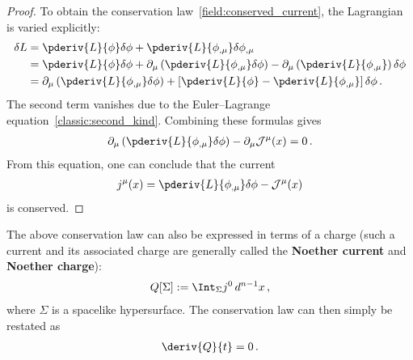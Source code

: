 \begin{theorem}
\begin{mdframed}[roundcorner=10pt, linecolor=blue, linewidth=1pt]
\begin{proof}
                To obtain the conservation law~\eqref{field:conserved_current}, the Lagrangian is varied explicitly:
                \begin{align*}
                    \delta L &= \pderiv{L}{\phi}\delta\phi + \pderiv{L}{\phi_{,\mu}}\delta\phi_{,\mu}\\
                    &= \pderiv{L}{\phi}\delta\phi + \partial_\mu\left(\pderiv{L}{\phi_{,\mu}}\delta\phi\right) - \partial_\mu\left(\pderiv{L}{\phi_{,\mu}}\right)\delta\phi\\
                    &= \partial_\mu\left(\pderiv{L}{\phi_{,\mu}}\delta\phi\right) + \left[\pderiv{L}{\phi} - \pderiv{L}{\phi_{,\mu}}\right]\delta\phi\,.
                \end{align*}
                The second term vanishes due to the Euler--Lagrange equation~\eqref{classic:second_kind}. Combining these formulas gives
                \begin{gather}
                    \partial_\mu\left(\pderiv{L}{\phi_{,\mu}}\delta\phi\right) - \partial_\mu\mathcal{J}^\mu(x) = 0\,.
                \end{gather}
                From this equation, one can conclude that the current
                \begin{gather}
                    j^\mu(x) = \pderiv{L}{\phi_{,\mu}}\delta\phi - \mathcal{J}^\mu(x)
                \end{gather}
                is conserved.
            \end{proof}
        \end{mdframed}
    \end{theorem}
    The above conservation law can also be expressed in terms of a charge (such a current and its associated charge are generally called the \textbf{Noether current} and \textbf{Noether charge}):
    \begin{gather}
        \label{field:noether_charge}
        Q[\Sigma] := \Int_\Sigma j^0\,d^{n-1}x\,,
    \end{gather}
    where $\Sigma$ is a spacelike hypersurface. The conservation law can then simply be restated as
    \begin{gather}
        \deriv{Q}{t} = 0\,.
    \end{gather}

